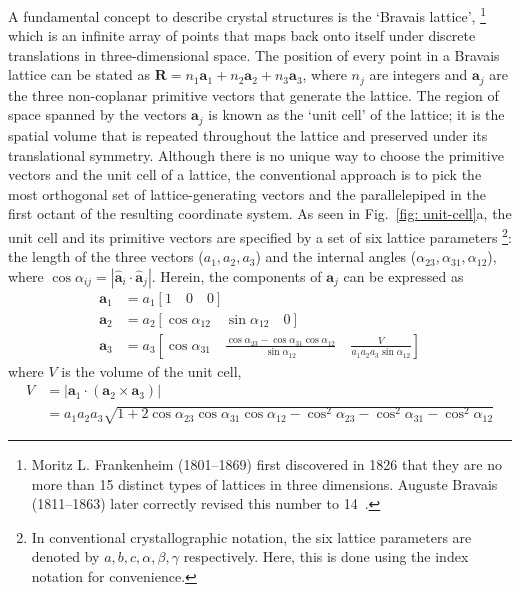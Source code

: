 A fundamental concept to describe crystal structures is the `Bravais lattice',%
\footnote{Moritz L. Frankenheim (1801--1869) first discovered in 1826 that
they are no more than 15 distinct types of lattices in three dimensions.
Auguste Bravais (1811--1863) later correctly revised this number to 14~\cite{XRDBook}.}
which is an infinite array of points that maps back onto itself
under discrete translations in three-dimensional space.
The position of every point in a Bravais lattice can be stated as
$\boldsymbol{R} = n_1 \boldsymbol{a}_1 + n_2 \boldsymbol{a}_2 + n_3 \boldsymbol{a}_3$,
where $n_j$ are integers and $\boldsymbol{a}_j$
are the three non-coplanar primitive vectors that generate the lattice.
The region of space spanned by the vectors $\boldsymbol{a}_j$
is known as the `unit cell' of the lattice;
it is the spatial volume that is repeated throughout the lattice
and preserved under its translational symmetry.
Although there is no unique way to choose the primitive vectors and
the unit cell of a lattice,
the conventional approach is to pick the most orthogonal set of
lattice-generating vectors and the parallelepiped in the first octant
of the resulting coordinate system.
As seen in Fig.~\ref{fig: unit-cell}a, the unit cell and its primitive vectors are specified
by a set of six lattice parameters%
\footnote{In conventional crystallographic notation, the six lattice parameters are
denoted by $a, b, c, \alpha, \beta, \gamma$ respectively.
Here, this is done using the index notation for convenience.}:
the length of the three vectors ($a_1, a_2, a_3$)
and the internal angles ($\alpha_{23}, \alpha_{31}, \alpha_{12}$),
where $\cos \alpha_{ij} = | \hat{\boldsymbol{a}}_i \cdot \hat{\boldsymbol{a}}_j|$.
Herein, the components of $\boldsymbol{a}_j$ can be expressed as
%
\begin{equation}
\begin{aligned}
  \boldsymbol{a}_1 & = a_1 \left[ 1 \quad 0 \quad 0 \right]  \\
  \boldsymbol{a}_2 & = a_2 \left[ \cos \alpha_{12} \quad \sin \alpha_{12} \quad 0 \right] \\
  \boldsymbol{a}_3 & = a_3 \left[ \cos \alpha_{31} \quad \frac{\cos \alpha_{23} - \cos \alpha_{31} \cos \alpha_{12}}{\sin \alpha_{12} } \quad \frac{V}{a_1 a_2 a_3 \sin \alpha_{12}} \right]
\end{aligned}
\end{equation}
%
where $V$ is the volume of the unit cell,
%
\begin{equation}
\begin{aligned}
  V & = \left| \boldsymbol{a}_1 \cdot (\boldsymbol{a}_2 \times \boldsymbol{a}_3) \right| \\
    & = a_1 a_2 a_3 \sqrt{1 + 2 \cos \alpha_{23} \cos \alpha_{31} \cos \alpha_{12} - \cos^2 \alpha_{23} - \cos^2 \alpha_{31} - \cos^2 \alpha_{12}}
\end{aligned}
\end{equation}

